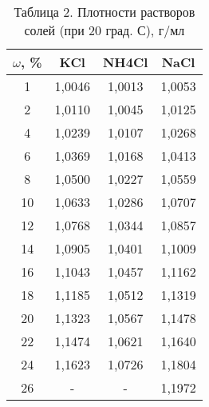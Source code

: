 \begin{longtable}[H]{|c|c|c|c|}
\caption{Таблица 2. Плотности растворов солей (при 20 град. С), г/мл}
\label{tabular:konztwo}\\
\hline 
$\omega$, \% & KCl & NH4Cl & NaCl\\
\hline 1 & 1,0046 & 1,0013 & 1,0053\\
\hline 2 & 1,0110 & 1,0045 & 1,0125\\
\hline 4 & 1,0239 & 1,0107 & 1,0268\\
\hline 6 & 1,0369 & 1,0168 & 1,0413\\
\hline 8 & 1,0500 & 1,0227 & 1,0559\\
\hline 10 & 1,0633 & 1,0286 & 1,0707\\
\hline 12 & 1,0768 & 1,0344 & 1,0857\\
\hline 14 & 1,0905 & 1,0401 & 1,1009\\
\hline 16 & 1,1043 & 1,0457 & 1,1162\\
\hline 18 & 1,1185 & 1,0512 & 1,1319\\
\hline 20 & 1,1323 & 1,0567 & 1,1478\\
\hline 22 & 1,1474 & 1,0621 & 1,1640\\
\hline 24 & 1,1623 & 1,0726 & 1,1804\\
\hline 26 & - & - & 1,1972\\
\hline
\end{longtable}
